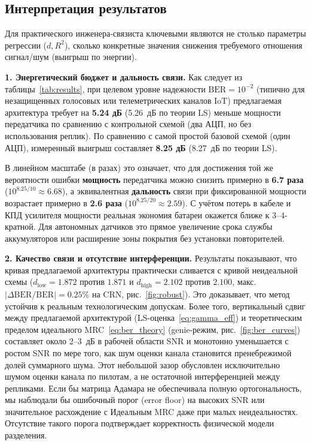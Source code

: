 \documentclass[a4paper,12pt]{article}
\numberwithin{equation}{section}
\newcommand{\BER}{\mathrm{BER}}
\begin{document}
\subsection{Интерпретация результатов}

Для практического инженера-связиста ключевыми являются не столько параметры регрессии ($d, R^2$), сколько конкретные значения снижения требуемого отношения сигнал/шум (выигрыш по энергии).

\textbf{1. Энергетический бюджет и дальность связи.}
Как следует из таблицы~\ref{tab:results}, при целевом уровне надежности $\BER=10^{-2}$ (типично для незащищенных голосовых или телеметрических каналов IoT) предлагаемая архитектура требует на \textbf{5.24 дБ} (5.26~дБ по теории LS) меньше мощности передатчика по сравнению с контрольной схемой (два АЦП, но без использования реплик).
По сравнению с самой простой базовой схемой (один АЦП), измеренный выигрыш составляет \textbf{8.25 дБ} (8.27~дБ по теории LS).

В линейном масштабе (в разах) это означает, что для достижения той же вероятности ошибки \textbf{мощность} передатчика можно снизить примерно в \textbf{6.7 раза} ($10^{8.25/10} \approx 6.68$), а эквивалентная \textbf{дальность} связи при фиксированной мощности возрастает примерно в \textbf{2.6 раза} ($10^{8.25/20} \approx 2.59$). С учётом потерь в кабеле и КПД усилителя мощности реальная экономия батареи окажется ближе к 3--4-кратной. Для автономных датчиков это прямое увеличение срока службы аккумуляторов или расширение зоны покрытия без установки повторителей.

\textbf{2. Качество связи и отсутствие интерференции.}
Результаты показывают, что кривая предлагаемой архитектуры практически сливается с кривой неидеальной схемы ($d_{\text{low}}=1.872$ против $1.871$ и $d_{\text{high}}=2.102$ против $2.100$, макс. $|\Delta\BER/\BER| = 0.25\%$ на CRN, рис.~\ref{fig:robust}). Это доказывает, что метод устойчив к реальным технологическим допускам. Более того, вертикальный сдвиг между предлагаемой архитектурой (LS-оценка~\eqref{eq:gamma_eff}) и теоретическим пределом идеального MRC~\eqref{eq:ber_theory} (genie-режим, рис.~\ref{fig:ber_curves}) составляет около 2--3~дБ в рабочей области SNR и монотонно уменьшается с ростом SNR по мере того, как шум оценки канала становится пренебрежимой долей суммарного шума. Этот небольшой зазор обусловлен исключительно шумом оценки канала по пилотам, а не остаточной интерференцией между репликами. Если бы матрица Адамара не обеспечивала полную ортогональность, мы наблюдали бы ошибочный порог (error floor) на высоких SNR или значительное расхождение с Идеальным MRC даже при малых неидеальностях. Отсутствие такого порога подтверждает корректность физической модели разделения.
\end{document}
